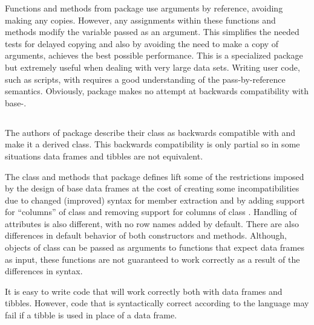 \documentclass[krantz2]{krantz}\usepackage{knitr}
\begin{document}
Functions and methods from package  use arguments by reference, avoiding making any copies. However, any assignments within these functions and methods modify the variable passed as an argument. This simplifies the needed tests for delayed copying and also by avoiding the need to make a copy of arguments, achieves the best possible performance. This is a specialized package but extremely useful when dealing with very large data sets. Writing user code, such as scripts, with  requires a good understanding of the pass-by-reference semantics. Obviously, package  makes no attempt at backwards compatibility with base-\Rlang {}.

\subsection{}\label{sec:data:tibble}

The authors of package  describe their  class as backwards compatible with  and make it a derived class. This backwards compatibility is only partial so in some situations data frames and tibbles are not equivalent.

The class and methods that package  defines lift some of the restrictions imposed by the design of base \Rlang data frames at the cost of creating some incompatibilities due to changed (improved) syntax for member extraction and by adding support for ``columns'' of class  and removing support for columns of class . Handling of attributes is also different, with no row names added by default. There are also differences in default behavior of both constructors and methods. Although, objects of class  can be passed as arguments to functions that expect data frames as input, these functions are not guaranteed to work correctly as a result of the differences in syntax.

\begin{warningbox}
It is easy to write code that will work correctly both with data frames and tibbles. However, code that is syntactically correct according to the \Rlang language may fail if a tibble is used in place of a data frame.
\end{warningbox}
\end{document}
